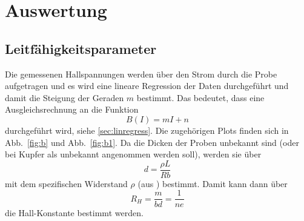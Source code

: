 \section{Auswertung}
\label{sec:Auswertung}



\subsection{Leitfähigkeitsparameter}
Die gemessenen Hallspannungen werden über den Strom durch die Probe aufgetragen und es wird eine lineare Regression der Daten durchgeführt und damit die Steigung der Geraden $m$ bestimmt. Das bedeutet, dass eine Ausgleichsrechnung an die Funktion
\begin{equation}
  B(I) = m I + n
\end{equation}
durchgeführt wird, siehe \ref{sec:linregress}. Die zugehörigen Plots finden sich in Abb.~\ref{fig:b} und Abb.~\ref{fig:b1}. Da die Dicken der Proben unbekannt sind (oder bei Kupfer als unbekannt angenommen werden soll), werden sie über \begin{equation}
  d = \frac{\rho L}{R b}
\end{equation}
mit dem spezifischen Widerstand $\rho$ (aus \cite{kkfkfkfkfkfkfkfkfkfkfkfkkfkfkfkfkkfkfkfkfkoekfoefkwpokwpoekfpowkefpowkefpowkefpowkpokwefpowkfpoewkfpowekfpoewkfpowkefpokefpowkefpowekfpoewkfpowekf}) bestimmt. Damit kann dann über \begin{equation}
  R_H = \frac{m}{bd} = \frac{1}{ne}
\end{equation}
die Hall-Konstante bestimmt werden.

